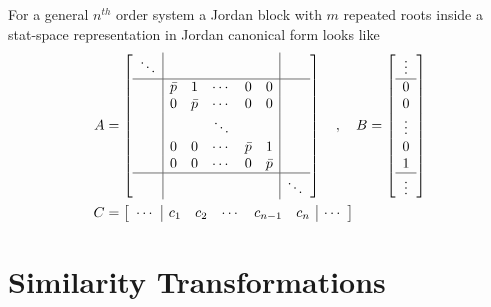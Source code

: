 \documentclass[twoside]{article}
\begin{document}
For a general $n^{th}$ order system a Jordan block 
with $m$ repeated roots inside a stat-space representation
in Jordan canonical form looks like
%
\begin{align*}
A &= \left[ \begin{array}{c|ccccc|c} 
\ddots & & & & & &
\\ \hline
& \bar{p} & 1 & \cdots & 0 & 0 & 
\\ & 0 & \bar{p} & \cdots & 0 & 0
\\ & & & \ddots & & & 
\\ & 0 & 0 & \cdots & \bar{p} & 1
    \\ & 0 & 0 & \cdots & 0 & \bar{p}
\\
\hline
& & & & & & \ddots
 \end{array} \right]
\quad , \quad 
B = \left[ \begin{array}{c} \vdots \\\hline 
0 \\ 0 \\ \vdots \\ 0 \\  1 \\ \hline
\vdots
\end{array} \right]
\\ C &= \left[ \begin{array}{c|ccccc|c} \cdots & 
c_1 & c_2 & \cdots &  c_{n-1} & c_n & \cdots\end{array} \right]
\end{align*}
%

\section{Similarity Transformations}
\end{document}
